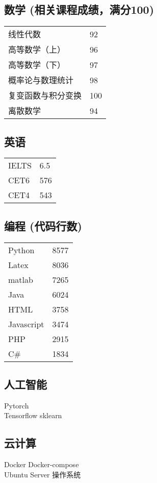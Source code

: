 \documentclass[]{deedy-resume-openfont}
\begin{document}
\begin{minipage}[t]{0.25\textwidth}
	\subsection{数学 {\small (相关课程成绩，满分100)}}
	\begin{tabular}{ll}
		线性代数           & 92  \\
		高等数学（上）     & 96  \\
		高等数学（下）     & 97  \\
		概率论与数理统计   & 98  \\
		复变函数与积分变换 & 100 \\
		离散数学 & 94 \\
	\end{tabular}
	\sectionsep
	\subsection{英语}
	\begin{tabular}{ll}
		IELTS & 6.5 \\
		CET6  & 576 \\
		CET4  & 543 \\
	\end{tabular}
	\sectionsep
	\subsection{编程 {\small (代码行数)}}
	\begin{tabular}{ll}
		Python     & 8577  \\
		Latex      & 8036  \\
		matlab     & 7265  \\
		Java       & 6024  \\
		HTML       & 3758  \\
		Javascript & 3474  \\
		PHP        & 2915  \\
		C\#        & 1834  \\
	\end{tabular}
	\sectionsep

	\subsection{人工智能}
	Pytorch \\
	Tensorflow \textbullet{} sklearn \\
    \sectionsep
    
	\subsection{云计算}
	Docker \textbullet{} Docker-compose \\
	Ubuntu Server 操作系统 \\
	\sectionsep


\end{minipage}
\end{document}
